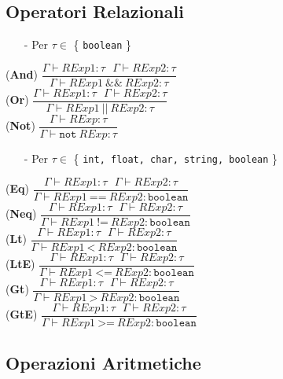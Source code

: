 \documentclass[12pt]{article}
\begin{document}
\subsection*{Operatori Relazionali}
\begin{center}
\begin{itemize}
\item[-] Per $\tau \in$ \{ \texttt{boolean} \}
\end{itemize}
\noindent(\textbf{And})
$\dfrac{\Gamma \vdash RExp1:\tau\ \ \ \Gamma \vdash RExp2:\tau}{\Gamma \vdash RExp1\ \texttt{\&\&} \ RExp2:\tau}$\\[0.1in]
\noindent(\textbf{Or})
$\dfrac{\Gamma \vdash RExp1:\tau\ \ \ \Gamma \vdash RExp2:\tau}{\Gamma \vdash RExp1\ \texttt{||} \ RExp2:\tau}$\\[0.1in]
\noindent(\textbf{Not})
$\dfrac{\Gamma \vdash RExp:\tau}{\Gamma \vdash \texttt{not}\  RExp:\tau}$\\[0.1in]

\begin{itemize}
\item[-] Per $\tau \in$ \{ \texttt{int, float, char, string, boolean} \}
\end{itemize}
\noindent(\textbf{Eq})
$\dfrac{\Gamma \vdash RExp1:\tau\ \ \ \Gamma \vdash RExp2:\tau}{\Gamma \vdash RExp1\ \texttt{==}\ RExp2:\texttt{boolean}}$\\[0.1in]
\noindent(\textbf{Neq})
$\dfrac{\Gamma \vdash RExp1:\tau\ \ \ \Gamma \vdash RExp2:\tau}{\Gamma \vdash RExp1\ \texttt{!=}\ RExp2:\texttt{boolean}}$\\[0.1in]
\noindent(\textbf{Lt})
$\dfrac{\Gamma \vdash RExp1:\tau\ \ \ \Gamma \vdash RExp2:\tau}{\Gamma \vdash RExp1\ \texttt{<}\ RExp2:\texttt{boolean}}$\\[0.1in]
\noindent(\textbf{LtE})
$\dfrac{\Gamma \vdash RExp1:\tau\ \ \ \Gamma \vdash RExp2:\tau}{\Gamma \vdash RExp1\ \texttt{<=}\ RExp2:\texttt{boolean}}$\\[0.1in]
\noindent(\textbf{Gt})
$\dfrac{\Gamma \vdash RExp1:\tau\ \ \ \Gamma \vdash RExp2:\tau}{\Gamma \vdash RExp1\ \texttt{>}\ RExp2:\texttt{boolean}}$\\[0.1in]
\noindent(\textbf{GtE})
$\dfrac{\Gamma \vdash RExp1:\tau\ \ \ \Gamma \vdash RExp2:\tau}{\Gamma \vdash RExp1\ \texttt{>=}\ RExp2:\texttt{boolean}}$\\[0.1in]
\end{center}

\subsection*{Operazioni Aritmetiche}
\end{document}
